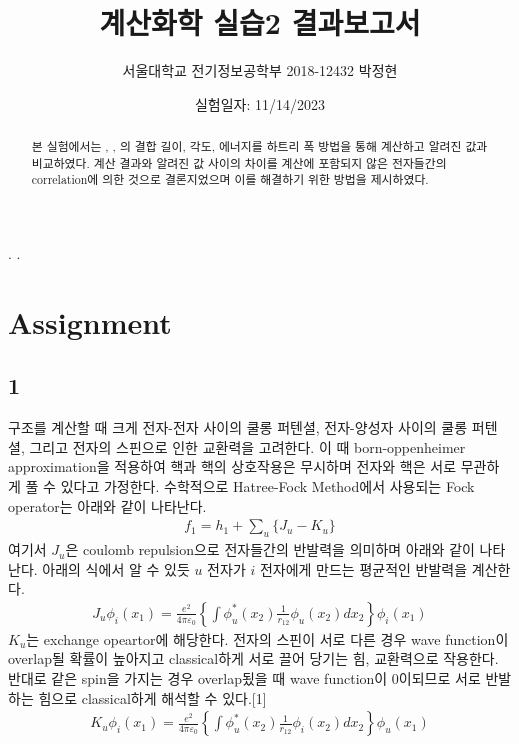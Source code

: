 \documentclass[%
 reprint,
 amsmath,amssymb,
 aps,
]{revtex4-2}
\begin{document}
\title{계산화학 실습2 결과보고서}

\author{서울대학교 전기정보공학부 2018-12432 박정현}
\date{실험일자: 11/14/2023}%

\begin{abstract}
본 실험에서는 , , 의 결합 길이, 각도, 에너지를 하트리 폭 방법을 통해 계산하고 알려진 값과 비교하였다. 계산 결과와 알려진 값 사이의 차이를 계산에 포함되지 않은 전자들간의 correlation에 의한 것으로 결론지었으며 이를 해결하기 위한 방법을 제시하였다.
\end{abstract}

\maketitle
.\newpage
.\newpage


\section{\label{sec:level1}Assignment}
\subsection{\label{sec:level2}1}
 구조를 계산할 때 크게 전자-전자 사이의 쿨롱 퍼텐셜, 전자-양성자 사이의 쿨롱 퍼텐셜, 그리고 전자의 스핀으로 인한 교환력을 고려한다. 이 때 born-oppenheimer approximation을 적용하여  핵과 핵의 상호작용은 무시하며 전자와 핵은 서로 무관하게 풀 수 있다고 가정한다. 수학적으로 Hatree-Fock Method에서 사용되는 Fock operator는 아래와 같이 나타난다.
\begin{align}
	f_{1} = h_{1} + \sum_{u}\{J_{u}-K_{u}\}
\end{align}
여기서 $J_{u}$은 coulomb repulsion으로 전자들간의 반발력을 의미하며 아래와 같이 나타난다. 아래의 식에서 알 수 있듯 $u$ 전자가 $i$ 전자에게 만드는 평균적인 반발력을 계산한다.
\begin{align}
	J_{u}\phi_{i}(x_{1}) = \frac{e^{2}}{4\pi\varepsilon_{0}}\left\{ \int \phi_{u}^{*}(x_{2})\frac{1}{r_{12}}\phi_{u}(x_{2})dx_{2} \right\}\phi_{i}(x_{1})
\end{align}
$K_{u}$는 exchange opeartor에 해당한다. 전자의 스핀이 서로 다른 경우 wave function이 overlap될 확률이 높아지고 classical하게 서로 끌어 당기는 힘, 교환력으로 작용한다. 반대로 같은 spin을 가지는 경우 overlap됬을 때 wave function이 0이되므로 서로 반발하는 힘으로 classical하게 해석할 수 있다.[1]
\begin{align}
	K_{u}\phi_{i}(x_{1}) = \frac{e^{2}}{4\pi\varepsilon_{0}}\left\{ \int \phi_{u}^{*}(x_{2})\frac{1}{r_{12}}\phi_{i}(x_{2})dx_{2} \right\}\phi_{u}(x_{1})
\end{align}
\end{document}
